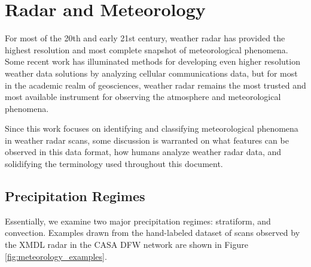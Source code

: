 \chapter{Radar and Meteorology}
\label{sec:meteorology}

For most of the 20th and early 21st century, weather radar has provided the highest resolution and most complete snapshot of meteorological phenomena. 
Some recent work has illuminated methods for developing even higher resolution weather data solutions by analyzing cellular communications data, but for most in the academic realm of geosciences, weather radar remains the most trusted and most available instrument for observing the atmosphere and meteorological phenomena.

Since this work focuses on identifying and classifying meteorological phenomena in weather radar scans, some discussion is warranted on what features can be observed in this data format, how humans analyze weather radar data, and solidifying the terminology used throughout this document.

\section{Precipitation Regimes}
\label{sec:meteorology_precip}

Essentially, we examine two major precipitation regimes: stratiform, and convection.
Examples drawn from the hand-labeled dataset of scans observed by the XMDL radar in the CASA DFW network are shown in Figure \ref{fig:meteorology_examples}.

